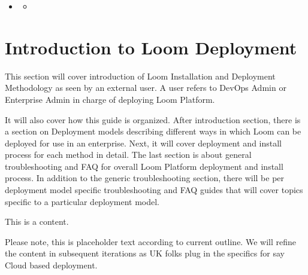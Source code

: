 \documentclass[letterpaper,10pt,english]{sphinxmanual}
\begin{document}
\begin{sphinxShadowBox}
\begin{itemize}
\begin{itemize}
\end{itemize}

\item {} 
\label{\detokenize{loom_installation_guide:id45}}{\hyperref[\detokenize{loom_installation_guide:deployment-faq}]{}}
\begin{itemize}
\item {} 
\label{\detokenize{loom_installation_guide:id46}}{\hyperref[\detokenize{loom_installation_guide:question-a-related-to-any-type-of-loom-deployment}]{}}

\end{itemize}

\end{itemize}
\end{sphinxShadowBox}


\chapter{Introduction to Loom Deployment}
\label{\detokenize{loom_installation_guide:introduction-to-loom-deployment}}\label{\detokenize{loom_installation_guide:installation-guide-rst}}\label{\detokenize{loom_installation_guide:loom-installation-deployment-guide}}
This section will cover introduction of Loom Installation and Deployment Methodology as seen by an external user. A user refers to DevOps Admin or Enterprise Admin in charge of deploying Loom Platform.

It will also cover how this guide is organized.  After introduction section, there is a section on Deployment models describing different ways in which Loom can be deployed for use in an enterprise. Next, it will cover deployment and install process for each method in detail. The last section is about general troubleshooting and FAQ for overall Loom Platform deployment and install process.  In addition to the generic troubleshooting section, there will be per deployment model specific troubleshooting and FAQ guides that will cover topics specific to a particular deployment model.




This is a  content.



Please note, this is placeholder text according to current outline.  We will refine the content in subsequent iterations as UK folks plug in the specifics for say Cloud based deployment.
\end{document}
